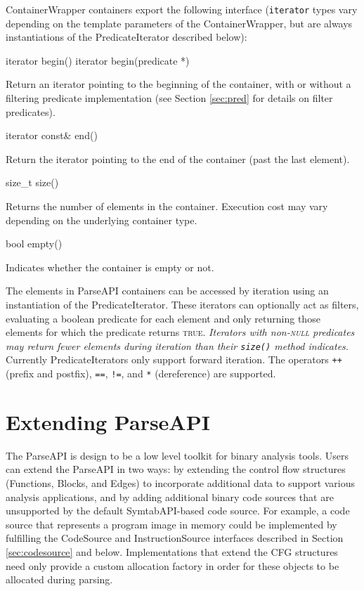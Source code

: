 \documentclass{article}
\newenvironment{apient}{\small\verbatim}{\endverbatim}
\newcommand{\apidesc}[1]{%
{\addtolength{\leftskip}{4em}%
#1\par\medskip}
}
\begin{document}
\noindent
ContainerWrapper containers export the following interface (\texttt{iterator} types vary depending on the template parameters of the ContainerWrapper, but are always instantiations of the PredicateIterator described below):

\begin{apient}
iterator begin()
iterator begin(predicate *)
\end{apient}
\apidesc{Return an iterator pointing to the beginning of the container, with or without a filtering predicate implementation (see Section \ref{sec:pred} for details on filter predicates).}

\begin{apient}
iterator const& end()
\end{apient}
\apidesc{Return the iterator pointing to the end of the container (past the last element).}

\begin{apient}
size_t size()
\end{apient}
\apidesc{Returns the number of elements in the container. Execution cost may vary depending on the underlying container type.}

\begin{apient}
bool empty()
\end{apient}
\apidesc{Indicates whether the container is empty or not.}

\noindent
The elements in ParseAPI containers can be accessed by iteration using an instantiation of the PredicateIterator. These iterators can optionally act as filters, evaluating a boolean predicate for each element and only returning those elements for which the predicate returns {\scshape true}. \emph{Iterators with non-{\scshape null} predicates may return fewer elements during iteration than their \texttt{size()} method indicates.} Currently PredicateIterators only support forward iteration. The operators \texttt{++} (prefix and postfix), \texttt{==}, \texttt{!=}, and \texttt{*} (dereference) are supported.


\appendix
\section{Extending ParseAPI}
\label{sec:extend}

The ParseAPI is design to be a low level toolkit for binary analysis tools.
Users can extend the ParseAPI in two ways: by extending the control flow
structures (Functions, Blocks, and Edges) to incorporate additional data to
support various analysis applications, and by adding additional binary code
sources that are unsupported by the default SymtabAPI-based code source. For
example, a code source that represents a program image in memory could be
implemented by fulfilling the CodeSource and InstructionSource interfaces
described in Section \ref{sec:codesource} and below. Implementations that
extend the CFG structures need only provide a custom allocation factory in
order for these objects to be allocated during parsing.
\end{document}
